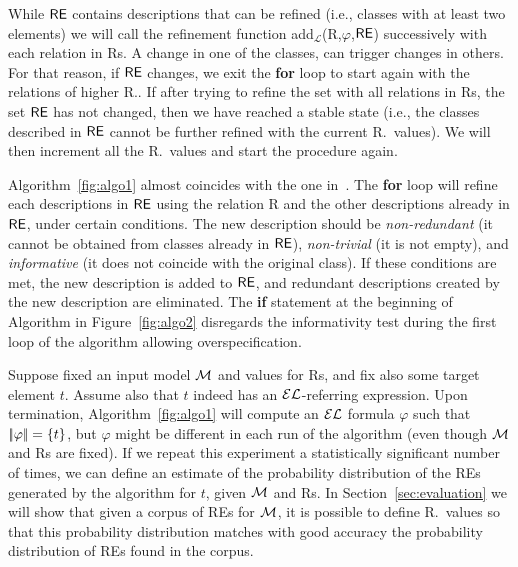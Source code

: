 While $\textsf{RE}$ contains descriptions that can be refined (i.e., classes with at least two elements) we will call the refinement function add$_\mathcal{L}$(R,$\varphi$,$\textsf{RE}$) successively with each relation in Rs. A change in one of the classes, can trigger changes in others. For that reason, if $\textsf{RE}$ changes, we exit the \textbf{for} loop to start again with the relations of higher R.\puse. If after trying to refine the set with all relations in Rs, the set $\textsf{RE}$ has not changed, then we have reached a stable state (i.e., the classes described in $\textsf{RE}$ cannot be further refined with the current R.\puse\ values). We will then increment all the R.\puse\ values and start the procedure again. 

Algorithm~\ref{fig:algo1} almost coincides with the one in~\cite{arec2:2008:Areces}.  The \textbf{for} loop will refine each descriptions in $\textsf{RE}$ using the relation R and the other descriptions already in $\textsf{RE}$, under certain conditions. The new description should be \emph{non-redundant} (it cannot be obtained from classes already in $\textsf{RE}$), \emph{non-trivial} (it is not empty), and \emph{informative} (it does not coincide with the original class).  If these conditions are met, the new description is added to $\textsf{RE}$, and redundant descriptions created by the new description are eliminated. The \textbf{if} statement at the beginning of Algorithm in Figure~\ref{fig:algo2} disregards the informativity test during the first loop of the algorithm allowing overspecification.    

Suppose fixed an input model $\mathcal{M}$ and values for Rs, and fix also some target element $t$.  Assume also that $t$ indeed has an $\mathcal{EL}$-referring expression.  Upon termination, Algorithm~\ref{fig:algo1} will compute an $\mathcal{EL}$ formula $\varphi$ such that $|\!|\varphi|\!| = \{t\}$, but $\varphi$ might be different in each run of the algorithm (even though $\mathcal{M}$ and Rs are fixed).  If we repeat this experiment a statistically significant number of times, we can define an estimate of the probability distribution of the REs generated by the algorithm for $t$, given $\mathcal{M}$ and Rs. In Section~\ref{sec:evaluation} we will show that given a corpus of REs for $\mathcal{M}$, it is possible to define R.\puse\ values so that this probability distribution matches with good accuracy the probability distribution of REs found in the corpus.  

